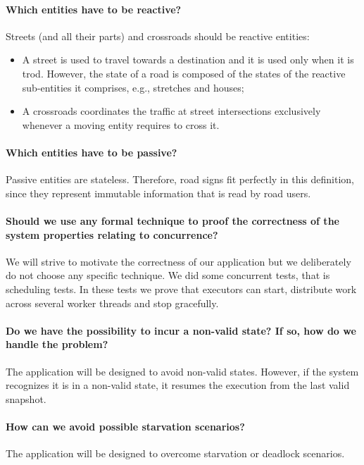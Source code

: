 \paragraph{Which entities have to be reactive?}
Streets (and all their parts) and crossroads should be reactive entities:
\begin{itemize}
  \item A street is used to travel towards a destination and it is used only
    when it is trod.
    However, the state of a road is composed of the states of the reactive
    sub-entities it comprises, e.g., stretches and houses;
  \item A crossroads coordinates the traffic at street intersections
    exclusively whenever a moving entity requires to cross it.
\end{itemize}

\paragraph{Which entities have to be passive?}
Passive entities are stateless. Therefore, road signs fit perfectly in this
definition, since they represent immutable information that is read by road
users.

\paragraph{Should we use any formal technique to proof the correctness
of the system properties relating to concurrence?}
We will strive to motivate the correctness of our application but we
deliberately do not choose any specific technique.
We did some concurrent tests, that is scheduling tests. In these tests we prove
that executors can start, distribute work across several worker threads and
stop gracefully.

\paragraph{Do we have the possibility to incur a non-valid state?
If so, how do we handle the problem?}
The application will be designed to avoid non-valid states.
However, if the system recognizes it is in a non-valid state, it resumes the
execution from the last valid snapshot.

\paragraph{How can we avoid possible starvation scenarios?}
The application will be designed to overcome starvation or deadlock scenarios.

